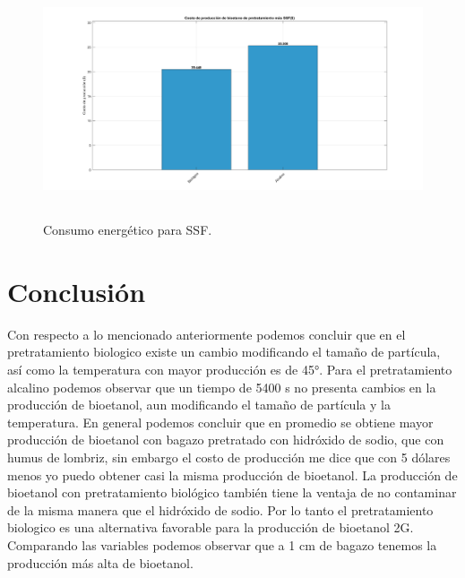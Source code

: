 \documentclass[12pt]{article}
\begin{document}
\begin{figure} [H]
	\centering
	\includegraphics[width=16cm, height=7cm]{imagenes/costos}
	\caption{Consumo energético para SSF. }
	\label{grafica}
\end{figure}

		\section{Conclusión}
		Con respecto a lo mencionado anteriormente podemos concluir que en el pretratamiento biologico existe un cambio modificando el tamaño de partícula, así como la temperatura con mayor producción es de 45°.
		Para el pretratamiento alcalino podemos observar que un tiempo de  5400 s no presenta cambios en la producción de bioetanol, aun modificando el tamaño de partícula y la temperatura. En general podemos concluir que en promedio se obtiene mayor producción de bioetanol con bagazo pretratado con hidróxido de sodio, que con humus de lombriz, sin embargo el costo de producción me dice que con 5 dólares menos yo puedo obtener casi la misma producción de bioetanol. La producción de bioetanol con pretratamiento biológico también tiene la ventaja de no contaminar de la misma manera que el hidróxido de sodio.
		Por lo tanto el pretratamiento biologico es una alternativa favorable para la producción de bioetanol 2G. Comparando las variables podemos observar que a 1 cm de bagazo tenemos la producción más alta de bioetanol.
		
		
		
			
\end{document}
